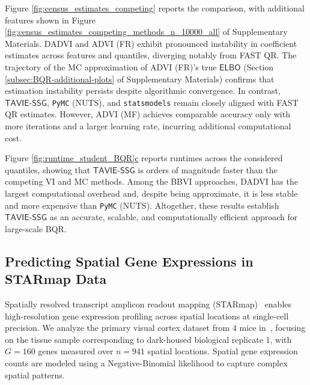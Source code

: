 \documentclass[12pt]{article}
\numberwithin{equation}{section}
\newcommand{\tssg}{\mathsf{TAVIE}\text{-}\mathsf{SSG}}
\begin{document}
Figure \ref{fig:census_estimates_competing} reports the comparison, with additional features shown in Figure \ref{fig:census_estimates_competing_methods_n_10000_all} of Supplementary Materials. DADVI and ADVI (FR) exhibit pronounced instability in coefficient estimates across features and quantiles, diverging notably from FAST QR. The trajectory of the MC approximation of ADVI (FR)'s true $\mathsf{ELBO}$ (Section \ref{subsec:BQR-additional-plots} of Supplementary Materials) confirms that estimation instability persists despite algorithmic convergence. In contrast, $\tssg$, \texttt{PyMC} (NUTS), and \texttt{statsmodels} remain closely aligned with FAST QR estimates. However, ADVI (MF) achieves comparable accuracy only with more iterations and a larger learning rate, incurring additional computational cost.

Figure \hyperref[fig:runtime_student_BQR]{\ref{fig:runtime_student_BQR}c} reports runtimes across the considered quantiles, showing that $\tssg$ is orders of magnitude faster than the competing VI and MC methods. Among the BBVI approaches, DADVI has the largest computational overhead and, despite being approximate, it is less stable and more expensive than \texttt{PyMC} (NUTS). Altogether, these results establish $\tssg$ as an accurate, scalable, and computationally efficient approach for large-scale BQR.


\subsection{Predicting Spatial Gene Expressions in STARmap Data}\label{subsec:STARmap-data-study}

Spatially resolved transcript amplicon readout mapping (STARmap)~\citep{STARmap} enables high-resolution gene expression profiling across spatial locations at single-cell precision. We analyze the primary visual cortex dataset from $4$ mice in~\cite{STARmap}, focusing on the tissue sample corresponding to dark-housed biological replicate $1$, with $G=160$ genes measured over $n=941$ spatial locations. Spatial gene expression counts are modeled using a Negative-Binomial likelihood to capture complex spatial patterns.
\end{document}

